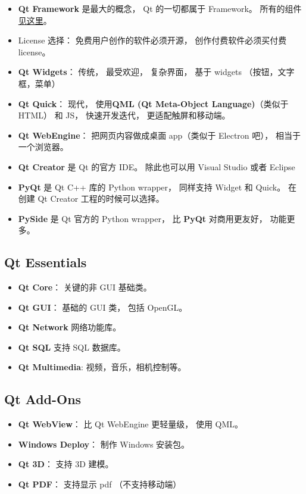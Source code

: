 
\begin{issues}
\issueDraft
\end{issues}

\begin{itemize}
\item \textbf{Qt Framework} 是最大的概念， Qt 的一切都属于 Framework。 所有的组件\href{https://doc.qt.io/qt-6/qtmodules.html}{见这里}。
\item License 选择： 免费用户创作的软件必须开源， 创作付费软件必须买付费 license。
\item \textbf{Qt Widgets}： 传统， 最受欢迎， 复杂界面， 基于 widgets （按钮，文字框，菜单）
\item \textbf{Qt Quick}： 现代， 使用\textbf{QML (Qt Meta-Object Language)}（类似于 HTML） 和 JS， 快速开发迭代， 更适配触屏和移动端。
\item \textbf{Qt WebEngine}： 把网页内容做成桌面 app（类似于 Electron 吧）， 相当于一个浏览器。
\item \textbf{Qt Creator} 是 Qt 的官方 IDE。 除此也可以用 Visual Studio 或者 Eclipse
\item \textbf{PyQt} 是 Qt C++ 库的 Python wrapper， 同样支持 Widget 和 Quick。 在创建 Qt Creator 工程的时候可以选择。
\item \textbf{PySide} 是 Qt 官方的 Python wrapper， 比 \textbf{PyQt} 对商用更友好， 功能更多。
\end{itemize}

\subsection{Qt Essentials}
\begin{itemize}
\item \textbf{Qt Core}： 关键的非 GUI 基础类。
\item \textbf{Qt GUI}： 基础的 GUI 类， 包括 OpenGL。
\item \textbf{Qt Network} 网络功能库。
\item \textbf{Qt SQL} 支持 SQL 数据库。
\item \textbf{Qt Multimedia}: 视频，音乐，相机控制等。
\end{itemize}

\subsection{Qt Add-Ons}
\begin{itemize}
\item \textbf{Qt WebView}： 比 Qt WebEngine 更轻量级， 使用 QML。
\item \textbf{Windows Deploy}： 制作 Windows 安装包。
\item \textbf{Qt 3D}： 支持 3D 建模。
\item \textbf{Qt PDF}： 支持显示 pdf （不支持移动端）
\end{itemize}
